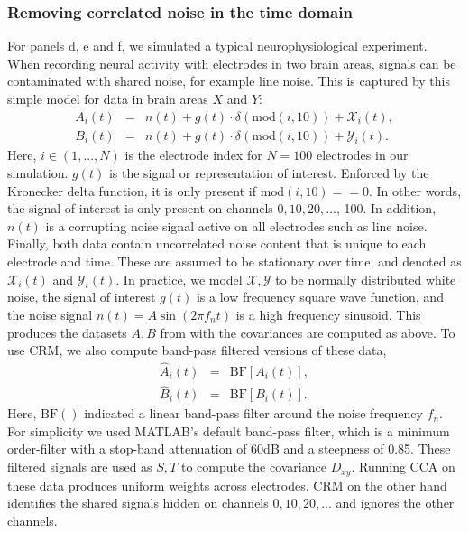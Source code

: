 \documentclass{article}
\begin{document}
\subsubsection*{Removing correlated noise in the time domain}
For panels d, e and f, we simulated a typical neurophysiological experiment. When recording neural activity with electrodes in two brain areas, signals can be contaminated with shared noise, for example line noise. This is captured by this simple model for data in brain areas $X$ and $Y$:
\begin{eqnarray}
A_i(t) &=& n(t) + g(t)\cdot\delta(\text{mod}(i,10)) + \mathcal{X}_i(t),\label{Xftt}\\
B_i(t) &=& n(t) + g(t)\cdot\delta(\text{mod}(i,10)) + \mathcal{Y}_i(t).\label{Yftt}
\end{eqnarray}
Here, $i\in(1,...,N)$ is the electrode index for $N=100$ electrodes in our simulation. $g(t)$ is the signal or representation of interest. Enforced by the Kronecker delta function, it is only present if $\text{mod}(i,10)==0$. In other words, the signal of interest is only present on channels $0, 10, 20, \dots$, 100. In addition, $n(t)$ is a corrupting noise signal active on all electrodes such as line noise. Finally, both data contain uncorrelated noise content that is unique to each electrode and time. These are assumed to be stationary over time, and denoted as $\mathcal{X}_i(t)$ and $\mathcal{Y}_i(t)$. In practice, we model $\mathcal{X}, \mathcal{Y}$ to be normally distributed white noise, the signal of interest $g(t)$ is a low frequency square wave function, and the noise signal $n(t)=A \sin(2\pi f_n t)$ is a high frequency sinusoid. This produces the datasets $A, B$ from with the covariances are computed as above. To use CRM, we also compute band-pass filtered versions of these data,
\begin{eqnarray}
\hat{A}_i(t) &=& \text{BF}[A_i(t) ],\\
\hat{B}_i(t) &=& \text{BF}[B_i(t) ].
\end{eqnarray}
Here, $\text{BF}()$ indicated a linear band-pass filter around the noise frequency $f_n$. For simplicity we used MATLAB's default band-pass filter, which is a minimum order-filter with a stop-band attenuation of 60dB and a steepness of 0.85. These filtered signals are used as $S,T$ to compute the covariance $D_{xy}$. Running CCA on these data produces uniform weights across electrodes. CRM on the other hand identifies the shared signals hidden on channels $0, 10, 20, \dots$ and ignores the other channels.
\end{document}
